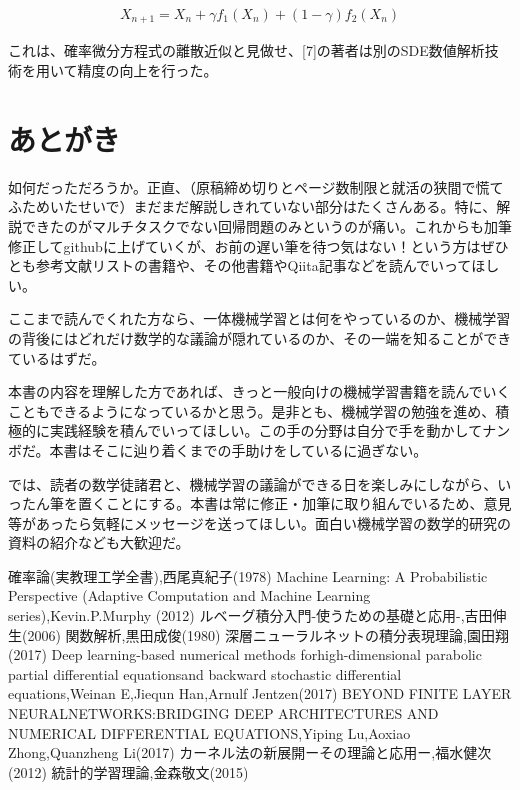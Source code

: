 \documentclass[dvipdfmx, a4paper]{jsarticle}
\begin{document}
\begin{align}
X_{n+1}=X_n+\gamma f_1(X_n)+(1-\gamma)f_2(X_n) 
\end{align}

これは、確率微分方程式の離散近似と見做せ、[7]の著者は別のSDE数値解析技術を用いて精度の向上を行った。



\newpage
\section{あとがき}
如何だっただろうか。正直、（原稿締め切りとページ数制限と就活の狭間で慌てふためいたせいで）まだまだ解説しきれていない部分はたくさんある。特に、解説できたのがマルチタスクでない回帰問題のみというのが痛い。これからも加筆修正してgithubに上げていくが、お前の遅い筆を待つ気はない！という方はぜひとも参考文献リストの書籍や、その他書籍やQiita記事などを読んでいってほしい。

ここまで読んでくれた方なら、一体機械学習とは何をやっているのか、機械学習の背後にはどれだけ数学的な議論が隠れているのか、その一端を知ることができているはずだ。

本書の内容を理解した方であれば、きっと一般向けの機械学習書籍を読んでいくこともできるようになっているかと思う。是非とも、機械学習の勉強を進め、積極的に実践経験を積んでいってほしい。この手の分野は自分で手を動かしてナンボだ。本書はそこに辿り着くまでの手助けをしているに過ぎない。

では、読者の数学徒諸君と、機械学習の議論ができる日を楽しみにしながら、いったん筆を置くことにする。本書は常に修正・加筆に取り組んでいるため、意見等があったら気軽にメッセージを送ってほしい。面白い機械学習の数学的研究の資料の紹介なども大歓迎だ。




\begin{thebibliography}{99}
   確率論(実教理工学全書),西尾真紀子(1978)
   Machine Learning: A Probabilistic Perspective (Adaptive Computation and Machine Learning series),Kevin.P.Murphy (2012)
   ルベーグ積分入門-使うための基礎と応用-,吉田伸生(2006)
   関数解析,黒田成俊(1980)
   深層ニューラルネットの積分表現理論,園田翔(2017)
   Deep learning-based numerical methods forhigh-dimensional parabolic partial differential equationsand backward stochastic differential equations,Weinan E,Jiequn Han,Arnulf Jentzen(2017)
   BEYOND FINITE LAYER NEURALNETWORKS:BRIDGING DEEP ARCHITECTURES AND NUMERICAL DIFFERENTIAL EQUATIONS,Yiping Lu,Aoxiao Zhong,Quanzheng Li(2017)
   カーネル法の新展開ーその理論と応用ー,福水健次(2012)
   統計的学習理論,金森敬文(2015)
\end{thebibliography}
\end{document}
